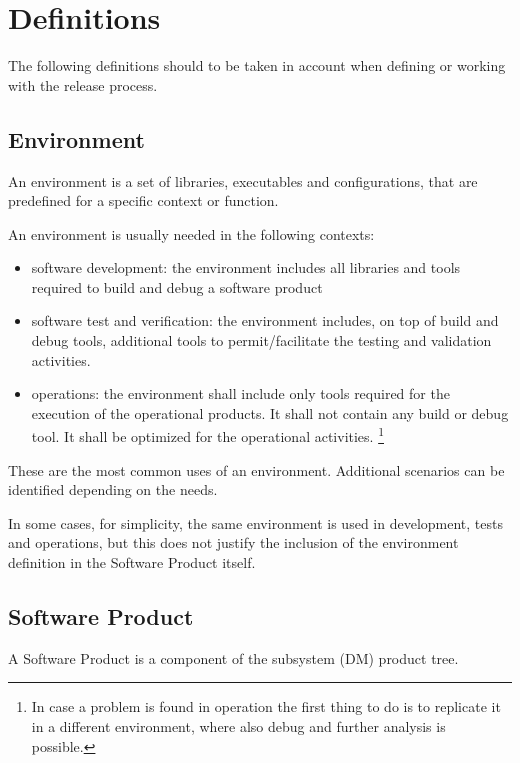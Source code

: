 \section{Definitions} \label{sec:defs}

The following definitions should to be taken in account when defining or working with the release process.


\subsection{Environment} \label{sec:envdef}

An environment is a set of libraries, executables and configurations, that are predefined for a specific context or function.

An environment is usually needed in the following contexts:

\begin{itemize}
\item software development: the environment includes all libraries and tools required to build and debug a software product
\item software test and verification: the environment includes, on top of build and debug tools, additional tools to permit/facilitate the testing and validation activities.
\item operations: the environment shall include only tools required for the execution of the operational products. It shall not contain any build or debug tool. It shall be optimized for the operational activities. \footnote{In case a problem is found in operation the first thing to do is to replicate it in a different environment, where also debug and further analysis is possible.}
\end{itemize}

These are the most common uses of an environment. Additional scenarios can be identified depending on the needs.

In some cases, for simplicity, the same environment is used in development, tests and operations, but this does not justify the inclusion of the environment definition in the Software Product itself.


\subsection{Software Product} \label{sec:swdef}

A Software Product is a component of the subsystem (DM) product tree.

